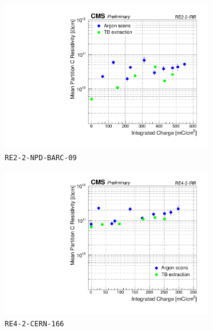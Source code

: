 	\begin{figure}[H]
    	\begin{subfigure}{0.5\linewidth}
			\centering
    		\includegraphics[width = \linewidth]{fig/chapt5/Extract-Res_vs_time_RE2-2-IRR.pdf}
        	\caption{\label{fig:Resistivity-extract:A} \texttt{RE2-2-NPD-BARC-09}}
    	\end{subfigure}
    	\begin{subfigure}{0.5\linewidth}
			\centering
    		\includegraphics[width = \linewidth]{fig/chapt5/Extract-Res_vs_time_RE4-2-IRR.pdf}
        	\caption{\label{fig:Resistivity-extract:B} \texttt{RE4-2-CERN-166}}
    	\end{subfigure}
    	\begin{subfigure}{0.5\linewidth}
			\centering

\end{subfigure}
\end{figure}

